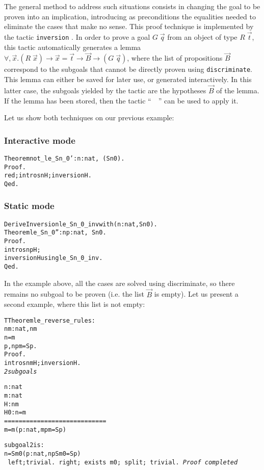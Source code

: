 \documentclass[11pt]{article}
\newcommand{\refmancite}[1]{{}}
\begin{document}
The general method to address such situations consists in changing the
goal to be proven into an implication, introducing as preconditions
the equalities needed to eliminate the cases that make no
sense. This proof technique is implemented by the tactic
\texttt{inversion} \refmancite{Section \ref{Inversion}}. In order
to prove a goal $G\;\vec{q}$ from an object of type $R\;\vec{t}$,
this tactic automatically generates a lemma $\forall, \vec{x}.
(R\;\vec{x}) \rightarrow \vec{x}=\vec{t}\rightarrow \vec{B}\rightarrow
(G\;\vec{q})$, where the list of propositions $\vec{B}$ correspond to
the subgoals that cannot be directly proven using
\texttt{discriminate}. This lemma can either be saved for later
use, or generated interactively. In this latter case, the subgoals
yielded by the tactic are the hypotheses $\vec{B}$ of the lemma. If the
lemma has been stored, then the tactic \linebreak
 ``~~'' can be
used to apply it. 

Let us show both techniques on our previous example:

\subsubsection{Interactive mode}

\begin{alltt}
Theorem not_le_Sn_0' : {\prodsym} n:nat, ~ (S n {\coqle} 0).
Proof.
 red; intros n H ; inversion H.
Qed.
\end{alltt}


\subsubsection{Static mode}

\begin{alltt}

Derive Inversion le_Sn_0_inv with ({\prodsym} n :nat, S n {\coqle}  0).
Theorem le_Sn_0'' : {\prodsym} n p : nat, ~ S n {\coqle} 0 .
Proof.
 intros n p H; 
 inversion H using le_Sn_0_inv.
Qed.
\end{alltt}


In the example above, all the cases are solved using discriminate, so
there remains no subgoal to be proven (i.e. the list $\vec{B}$ is
empty). Let us present a second example, where this list is not empty:


\begin{alltt}
TTheorem le_reverse_rules : 
     {\prodsym} n m:nat, n {\coqle} m {\arrow} 
                     n = m {\coqor}  
                     {\exsym} p, n {\coqle}  p {\coqand} m = S p.
Proof.
 intros n m H; inversion H.
\it
2 subgoals



  
  n : nat
  m : nat
  H : n {\coqle} m
  H0 : n = m
  ============================
   m = m {\coqor} ({\exsym} p : nat, m {\coqle} p {\coqand} m = S p)

subgoal 2 is:
 n = S m0 {\coqor} ({\exsym} p : nat, n {\coqle} p {\coqand} S m0 = S p)
\tt
 left;trivial.
 right; exists m0; split; trivial.
\it
Proof completed
\end{alltt}
\end{document}
